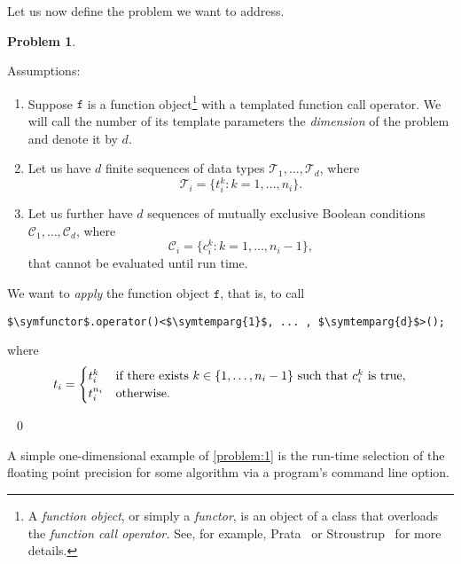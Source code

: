 \documentclass[10pt,a4paper]{article}
\theoremstyle{definition}\newtheorem{problem}{Problem}
\providecommand{\symdim}{\ensuremath{d}\xspace}
\providecommand{\symtypeset}[1]{\ensuremath{\mathcal{T}_{#1}}}
\providecommand{\symtype}[2]{\ensuremath{t_{#1}^{#2}}}
\providecommand{\symtypenum}[1]{\ensuremath{n_{#1}}}
\providecommand{\symcondset}[1]{\ensuremath{\mathcal{C}_{#1}}\xspace}
\providecommand{\symcond}[2]{\ensuremath{c_{#1}^{#2}}}
\providecommand{\symtemparg}[1]{\ensuremath{t_{#1}}}
\providecommand{\symfunctor}{\ensuremath{\mathtt{f}}}
\providecommand{\symfunctorx}{\symfunctor\xspace}
\providecommand{\range}[1]{\ensuremath{1,\ldots,#1}\xspace}
\providecommand{\rangetypenumi}{\ensuremath{\range{\symtypenum{i}}}\xspace}
\providecommand{\rangecondnumi}{\ensuremath{\range{\symtypenum{i}-1}}\xspace}
\begin{document}
\noindent
Let us now define the problem we want to address.
\begin{problem}
\label{problem:1}

Assumptions:
\begin{enumerate}
\item Suppose \symfunctorx is a function object\footnote{A \emph{function object}, or simply a \emph{functor}, is an object of a class that overloads the \emph{function call operator.} See, for example, Prata~\cite{RefWorks:81} or Stroustrup~\cite{RefWorks:79} for more details.}
with a templated function call operator. We will call the number of its template parameters the \emph{dimension} of the problem and denote it by \symdim.

\item Let us have \symdim finite sequences of data types $\symtypeset{1},\ldots,\symtypeset{d}$, where
\begin{displaymath}
\symtypeset{i}=\{\symtype{i}{k}:k=\rangetypenumi\}.
\end{displaymath}

\item Let us further have \symdim sequences of mutually exclusive Boolean conditions $\symcondset{1},\ldots,\symcondset{d}$, where
\begin{displaymath}
\symcondset{i}=\{\symcond{i}{k}:k=\rangecondnumi\},
\end{displaymath}
that cannot be evaluated until run time. 
\end{enumerate}
We want to \emph{apply} the function object \symfunctorx, that is, to call 
\begin{lstlisting}
$\symfunctor$.operator()<$\symtemparg{1}$, ... , $\symtemparg{d}$>();
\end{lstlisting}
where
\begin{displaymath}
\symtemparg{i}=\begin{cases}
\symtype{i}{k} & \text{if there exists $k\in\{\rangecondnumi\}$ such that \symcond{i}{k} is true}, \\
\symtype{i}{\symtypenum{i}} & \text{otherwise.}
\end{cases}
\end{displaymath}

\vspace{-1.2em} \ \qed
\end{problem}

\vspace{-0.3em}
A simple one-dimensional example of \autoref{problem:1} is the run-time selection of the floating point precision for some algorithm via a program's command line option.
\end{document}

